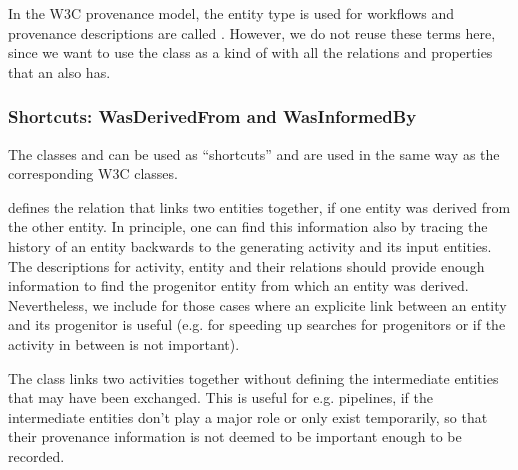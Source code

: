 In the W3C provenance model, the entity type  is used for workflows and 
provenance descriptions are called . However, we do not reuse these 
terms here, since we want to use the class  as a kind of 
with all the relations and properties that an  also has. 



%

\subsubsection{Shortcuts: WasDerivedFrom and WasInformedBy}\label{sec:shortcuts}
The classes  and  can be used as ``shortcuts'' and 
are used in the same way as the corresponding W3C classes.

 defines the relation that links two entities together, if one entity was derived
from the other entity. In principle, one can find this information also by tracing the 
history of an entity backwards to the generating activity and its input entities. 
The descriptions for activity, entity and their relations should provide enough
information to find the progenitor entity from which an entity was derived.
Nevertheless, we include  for those cases where an explicite 
link between an entity and its progenitor is useful (e.g. for speeding up searches for 
progenitors or if the activity in between is not important).

The class  links two activities together without defining the
intermediate entities that may have been exchanged. This is useful for e.g. pipelines, 
if the intermediate entities don't play a major role or only exist temporarily, so that
their provenance information is not deemed to be important enough to be recorded.
